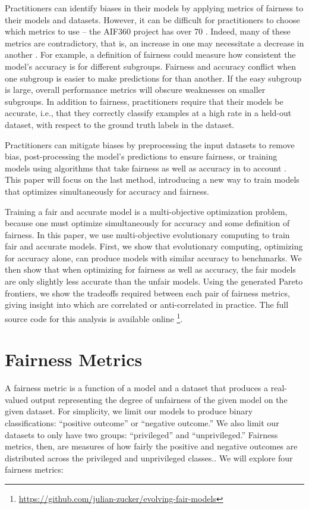 \documentclass[twoside]{article}
\begin{document}
Practitioners can identify biases in their models by applying metrics of fairness to their models and datasets. However, it can be difficult for practitioners to choose which metrics to use – the AIF360 project has over 70 \citep{Bellamy:2018}. Indeed, many of these metrics are contradictory, that is, an increase in one may necessitate a decrease in another \citep{Kleinberg:2016}. For example, a definition of fairness could measure how consistent the model’s accuracy is for different subgroups. Fairness and accuracy conflict when one subgroup is easier to make predictions for than another. If the easy subgroup is large, overall performance metrics will obscure weaknesses on smaller subgroups. In addition to fairness, practitioners require that their models be accurate, i.e., that they correctly classify examples at a high rate in a held-out dataset, with respect to the ground truth labels in the dataset.

Practitioners can mitigate biases by preprocessing the input datasets to remove bias, post-processing the model’s predictions to ensure fairness, or training models using algorithms that take fairness as well as accuracy in to account \citep{Angwin:2016}. This paper will focus on the last method, introducing a new way to train models that optimizes simultaneously for accuracy and fairness. 

Training a fair and accurate model is a multi-objective optimization problem, because one must optimize simultaneously for accuracy and some definition of fairness. In this paper, we use multi-objective evolutionary computing to train fair and accurate models. First, we show that evolutionary computing, optimizing for accuracy alone, can produce models with similar accuracy to benchmarks. We then show that when optimizing for fairness as well as accuracy, the fair models are only slightly less accurate than the unfair models. Using the generated Pareto frontiers, we show the tradeoffs required between each pair of fairness metrics, giving insight into which are correlated or anti-correlated in practice. The full source code for this analysis is available online \footnote{ \href{https://github.com/julian-zucker/evolving-fair-models}{https://github.com/julian-zucker/evolving-fair-models}}.

\section{Fairness Metrics}
A fairness metric is a function of a model and a dataset that produces a real-valued output representing the degree of unfairness of the given model on the given dataset. For simplicity, we limit our models to produce binary classifications: “positive outcome” or “negative outcome.” We also limit our datasets to only have two groups: “privileged” and “unprivileged.” Fairness metrics, then, are measures of how fairly the positive and negative outcomes are distributed across the privileged and unprivileged classes.\citep{Binns:2017}. We will explore four fairness metrics:
\end{document}
